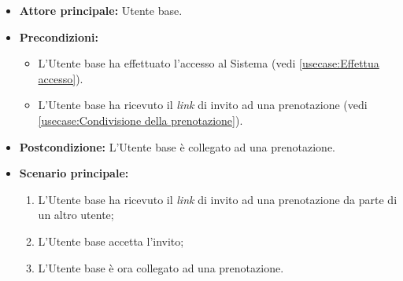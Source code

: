 \label{usecase:Accesso alla prenotazione}
\begin{itemize}
	\item \textbf{Attore principale:} Utente base.

	\item \textbf{Precondizioni:} 
	\begin{itemize}
		\item L'Utente base ha effettuato l'accesso al Sistema (vedi \autoref{usecase:Effettua accesso}).
		\item L'Utente base ha ricevuto il \textit{link} di invito ad una prenotazione (vedi \autoref{usecase:Condivisione della prenotazione}).
	\end{itemize}
		

	\item \textbf{Postcondizione:} L'Utente base è collegato ad una prenotazione.

	\item \textbf{Scenario principale:}
	      \begin{enumerate}
		      \item L'Utente base ha ricevuto il \textit{link} di invito ad una prenotazione da parte di un altro utente;
		      \item L'Utente base accetta l'invito;
		      \item L'Utente base è ora collegato ad una prenotazione.
	      \end{enumerate}
\end{itemize}
